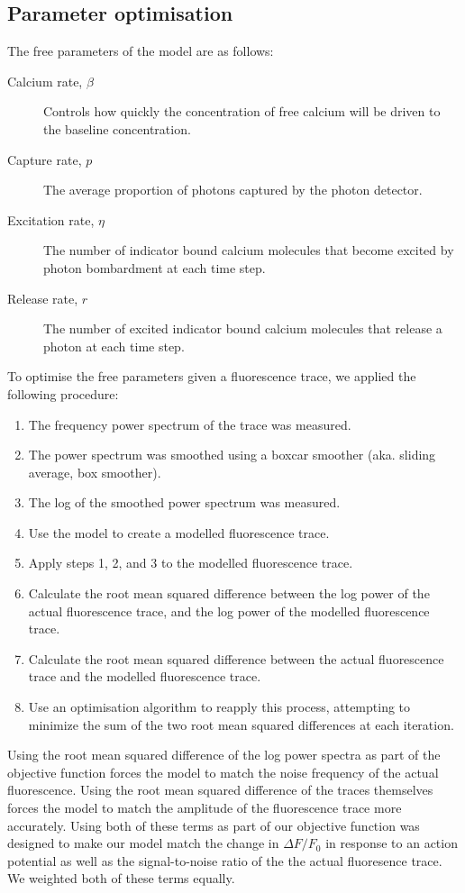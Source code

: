 \subsection{Parameter optimisation}\label{sec:parameter_optimisation}
The free parameters of the model are as follows:
\begin{description}
    \item[Calcium rate, $\beta$] Controls how quickly the concentration of free calcium will be driven to the baseline concentration.
    \item[Capture rate, $p$] The average proportion of photons captured by the photon detector.
    \item[Excitation rate, $\eta$] The number of indicator bound calcium molecules that become excited by photon bombardment at each time step.
    \item[Release rate, $r$] The number of excited indicator bound calcium molecules that release a photon at each time step.
\end{description}
To optimise the free parameters given a fluorescence trace, we applied the following procedure:
\begin{enumerate}
    \item The frequency power spectrum of the trace was measured.
    \item The power spectrum was smoothed using a boxcar smoother (aka. sliding average, box smoother).
    \item The log of the smoothed power spectrum was measured.
    \item Use the model to create a modelled fluorescence trace.
    \item Apply steps 1, 2, and 3 to the modelled fluorescence trace.
    \item Calculate the root mean squared difference between the log power of the actual fluorescence trace, and the log power of the modelled fluorescence trace.
    \item Calculate the root mean squared difference between the actual fluorescence trace and the modelled fluorescence trace.
    \item Use an optimisation algorithm to reapply this process, attempting to minimize the sum of the two root mean squared differences at each iteration.
\end{enumerate}
Using the root mean squared difference of the log power spectra as part of the objective function forces the model to match the noise frequency of the actual fluorescence. Using the root mean squared difference of the traces themselves forces the model to match the amplitude of the fluorescence trace more accurately. Using both of these terms as part of our objective function was designed to make our model match the change in $\Delta F/F_0$ in response to an action potential as well as the signal-to-noise ratio of the the actual fluoresence trace. We weighted both of these terms equally.

